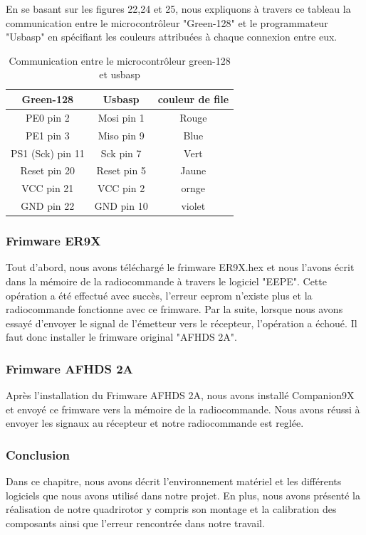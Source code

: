 \documentclass[a4paper,12pt]{book}
\begin{document}
En se basant sur les figures 22,24 et 25, nous expliquons à travers ce tableau la communication entre le microcontrôleur "Green-128" et le programmateur "Usbasp" en spécifiant les couleurs attribuées à chaque connexion entre eux.

\begin{table}[h]
	\begin{center}
		\caption{Communication entre le microcontrôleur green-128 et usbasp }
		\begin{tabular}{|c|c|c|}
			\hline
			\centering
			Green-128 &	Usbasp & couleur de file \\
			\hline
			PE0 pin 2 & Mosi pin 1 & Rouge  \\
			\hline
			PE1 pin 3 & Miso pin 9 & Blue  \\
			\hline
			PS1 (Sck)  pin 11 & Sck pin 7 & Vert  \\
			\hline
			Reset pin 20 & Reset pin 5 & Jaune \\
			\hline
			VCC pin 21 & VCC pin 2 &  ornge \\
			\hline
			GND pin 22 & GND pin 10 & violet \\
			\hline
		\end{tabular}
	\end{center}
\end{table}
\subsubsection{Frimware ER9X}
Tout d'abord, nous avons téléchargé le frimware ER9X.hex et nous l'avons écrit dans la mémoire de la radiocommande à travers le logiciel "EEPE". Cette opération a été effectué avec succès, l'erreur eeprom n'existe plus et la radiocommande fonctionne avec ce frimware. Par la suite, lorsque nous avons essayé d'envoyer le signal de l'émetteur vers le récepteur, l'opération a échoué. Il faut donc installer le frimware original "AFHDS 2A".
\subsubsection{Frimware AFHDS 2A}
Après l'installation du Frimware AFHDS 2A, nous avons installé Companion9X et envoyé ce frimware vers la mémoire de la radiocommande. Nous avons réussi à envoyer les signaux au récepteur et notre radiocommande est reglée.

\subsubsection{Conclusion}
Dans ce chapitre, nous avons décrit l'environnement matériel et les différents logiciels que nous avons utilisé dans notre projet. En plus, nous avons présenté la réalisation de notre quadrirotor y compris son montage et la calibration des composants ainsi que l'erreur rencontrée dans notre travail.
\end{document}
